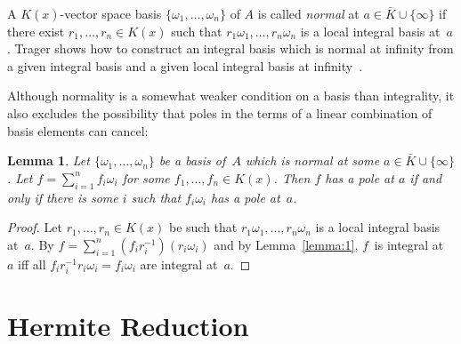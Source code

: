 \documentclass{sig-alternate}
\newtheorem{lemma}[theorem]{Lemma}
\begin{document}
A $K(x)$-vector space basis $\{\omega_1,\dots,\omega_n\}$ of $A$ is
called \emph{normal} at $a\in\bar K\cup\{\infty\}$ if there exist $r_1,\dots,r_n\in
K(x)$ such that $r_1\omega_1,\dots,r_n\omega_n$ is a local integral basis
at~$a$. Trager shows how to construct
an integral basis which is normal at infinity from a given integral basis and
a given local integral basis at infinity~\cite{trager84}.

Although normality is a somewhat weaker condition on a basis than integrality,
it also excludes the possibility that poles in the terms of a linear combination
of basis elements can cancel:

\begin{lemma}\label{lemma:3}
  Let $\{\omega_1,\dots,\omega_n\}$ be a basis of~$A$
  which is normal at some $a\in\bar K\cup\{\infty\}$.
  Let $f=\sum_{i=1}^n f_i\omega_i$ for some $f_1,\dots,f_n\in K(x)$.
  Then $f$ has a pole at $a$ if and only if
  there is some $i$ such that $f_i\omega_i$ has a pole at~$a$.
\end{lemma}
\begin{proof}
  Let $r_1,\dots,r_n\in K(x)$ be such that $r_1\omega_1,\dots,r_n\omega_n$ is a
  local integral basis at~$a$. By $f=\sum_{i=1}^n
  (f_ir_i^{-1})(r_i\omega_i)$ and by Lemma~\ref{lemma:1}, $f$~is integral at~$a$ iff all
  $f_ir_i^{-1}r_i\omega_i=f_i\omega_i$ are integral at~$a$.
\end{proof}

\section{Hermite Reduction}\label{sec:hermite}
\end{document}
